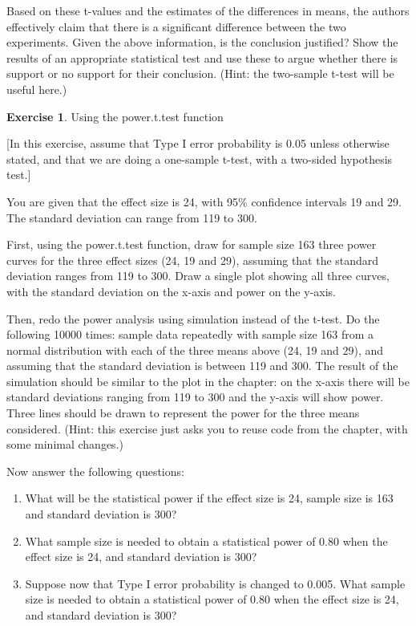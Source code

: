 \documentclass[
  12pt,
]{krantz}
\providecommand{\tightlist}{%
  \setlength{\itemsep}{0pt}\setlength{\parskip}{0pt}}
\theoremstyle{definition}
\theoremstyle{definition}
\theoremstyle{definition}
\newtheorem{exercise}{Exercise}[chapter]
\theoremstyle{definition}
\theoremstyle{remark}
\begin{document}
Based on these t-values and the estimates of the differences in means, the authors effectively claim that there is a significant difference between the two experiments. Given the above information, is the conclusion justified? Show the results of an appropriate statistical test and use these to argue whether there is support or no support for their conclusion. (Hint: the two-sample t-test will be useful here.)

\begin{exercise}
\protect\hypertarget{exr:SamplingDistrnexercisespowerttest}{}\label{exr:SamplingDistrnexercisespowerttest}Using the power.t.test function
\end{exercise}

{[}In this exercise, assume that Type I error probability is 0.05 unless otherwise stated, and that we are doing a one-sample t-test, with a two-sided hypothesis test.{]}

You are given that the effect size is 24, with 95\% confidence intervals 19 and 29. The standard deviation can range from 119 to 300.

First, using the power.t.test function, draw for sample size 163 three power curves for the three effect sizes (24, 19 and 29), assuming that the standard deviation ranges from 119 to 300. Draw a single plot showing all three curves, with the standard deviation on the x-axis and power on the y-axis.

Then, redo the power analysis using simulation instead of the t-test. Do the following 10000 times: sample data repeatedly with sample size 163 from a normal distribution with each of the three means above (24, 19 and 29), and assuming that the standard deviation is between 119 and 300. The result of the simulation should be similar to the plot in the chapter: on the x-axis there will be standard deviations ranging from 119 to 300 and the y-axis will show power. Three lines should be drawn to represent the power for the three means considered. (Hint: this exercise just asks you to reuse code from the chapter, with some minimal changes.)

Now answer the following questions:

\begin{enumerate}
\def\labelenumi{\arabic{enumi}.}
\tightlist
\item
  What will be the statistical power if the effect size is 24, sample size is 163 and standard deviation is 300?
\item
  What sample size is needed to obtain a statistical power of 0.80 when the effect size is 24, and standard deviation is 300?
\item
  Suppose now that Type I error probability is changed to 0.005. What sample size is needed to obtain a statistical power of 0.80 when the effect size is 24, and standard deviation is 300?
\end{enumerate}
\end{document}
